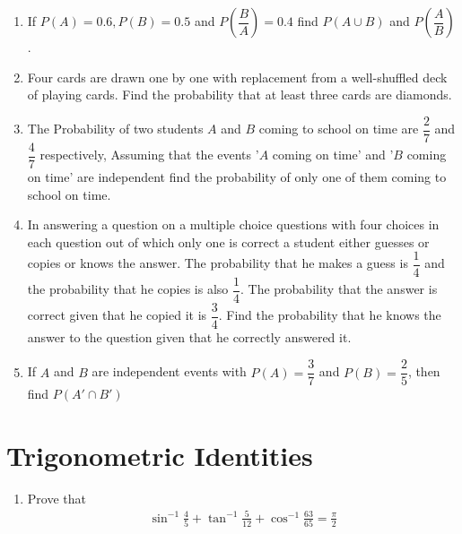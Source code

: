 \documentclass[12pt,-letter paper]{article}
\providecommand{\brak}[1]{\ensuremath{\left(#1\right)}}
\begin{document}
\begin{enumerate}
\item If $P\brak{A}=0.6, P\brak{B}=0.5$ and $P\brak{\dfrac{B}{A}}=0.4$ find $P\brak{A \cup B}$ and $P\brak{\dfrac{A}{B}}$.

\item Four cards are drawn one by one with replacement from a well-shuffled deck of playing cards. Find the probability that at least three cards are diamonds.

\item The Probability of two students $A$ and $B$ coming to school on time are $\dfrac{2}{7}$ and $\dfrac{4}{7}$ respectively, Assuming that the events '$A$ coming on time' and '$B$ coming on time' are independent find the probability of only one of them coming to school on time.

\item In answering a question on a multiple choice questions with four choices in each question out of which only one is correct a student either guesses or copies or knows the answer. The probability that he makes a guess is $\dfrac{1}{4}$ and the probability that he copies is also $\dfrac{1}{4}$. The probability that the answer is correct given that he copied it is $\dfrac{3}{4}$. Find the probability that he knows the answer to the question given that he correctly answered it.

\item If $A$ and $B$ are independent events with $P(A)=\dfrac{3}{7}$ and $P(B)=\dfrac{2}{5}$, then find $P(A' \cap B')$

\end{enumerate} 

\section{Trigonometric Identities}
\begin{enumerate}
    \item Prove that 
\begin{align*}
    \sin^{-1}\frac{4}{5}+\tan^{-1}\frac{5}{12}+\cos^{-1}\frac{63}{65}=\frac{\pi}{2}
\end{align*}

\end{enumerate}
\end{document}

